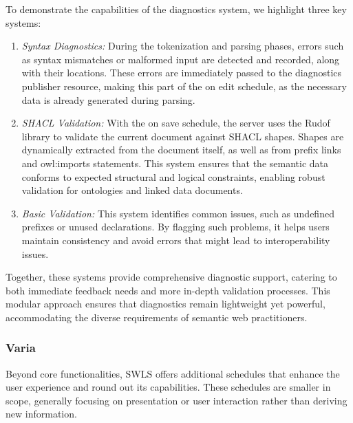 To demonstrate the capabilities of the diagnostics system, we highlight three key systems:

\begin{enumerate}
  \item \textit{Syntax Diagnostics:}
    During the tokenization and parsing phases, errors such as syntax mismatches or malformed input are detected and recorded, along with their locations.
    These errors are immediately passed to the diagnostics publisher resource, making this part of the on edit schedule, as the necessary data is already generated during parsing.
  \item \textit{SHACL Validation:} 
    With the on save schedule, the server uses the Rudof library to validate the current document against SHACL shapes.
    Shapes are dynamically extracted from the document itself, as well as from prefix links and owl:imports statements.
    This system ensures that the semantic data conforms to expected structural and logical constraints, enabling robust validation for ontologies and linked data documents.
  \item \textit{Basic Validation:}
    This system identifies common issues, such as undefined prefixes or unused declarations.
    By flagging such problems, it helps users maintain consistency and avoid errors that might lead to interoperability issues.
\end{enumerate}

Together, these systems provide comprehensive diagnostic support, catering to both immediate feedback needs and more in-depth validation processes.
This modular approach ensures that diagnostics remain lightweight yet powerful, accommodating the diverse requirements of semantic web practitioners.

\subsubsection{Varia}

Beyond core functionalities, SWLS offers additional schedules that enhance the user experience and round out its capabilities.
These schedules are smaller in scope, generally focusing on presentation or user interaction rather than deriving new information.

